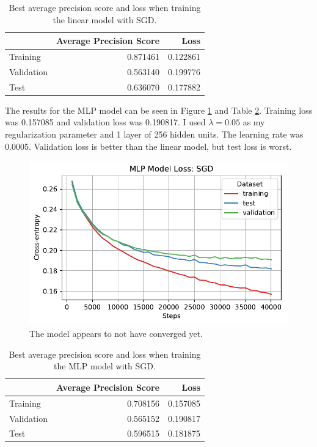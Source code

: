 \documentclass[letterpaper,11pt]{article}
\begin{document}
\begin{enumerate}
  \begin{table}
    \centering
    \begin{tabular}{lrr}
      \toprule
      {} &  Average Precision Score &      Loss \\
      \midrule
      Training   &                 0.871461 &  0.122861 \\
      Validation &                 0.563140 &  0.199776 \\
      Test       &                 0.636070 &  0.177882 \\
      \bottomrule
    \end{tabular}
    \caption{Best average precision score and loss when training the linear
      model with SGD.}
    \label{tab:linear_sgd}
  \end{table}

  The results for the MLP model can be seen in Figure \ref{fig:mlp_loss_sgd} and
  Table \ref{tab:mlp_sgd}. Training loss was 0.157085 and validation loss was
  0.190817. I used $\lambda = 0.05$ as my regularization parameter and 1 layer
  of 256 hidden units. The learning rate was 0.0005. Validation loss is better
  than the linear model, but test loss is worst.

  \begin{figure}
    \centering
    \includegraphics{problem4/mlp_loss_sgd.pdf}
    \caption{The model appears to not have converged yet.}
    \label{fig:mlp_loss_sgd}
  \end{figure}

  \begin{table}
    \centering
    \begin{tabular}{lrr}
      \toprule
      {} &  Average Precision Score &      Loss \\
      \midrule
      Training   &                 0.708156 &  0.157085 \\
      Validation &                 0.565152 &  0.190817 \\
      Test       &                 0.596515 &  0.181875 \\
      \bottomrule
    \end{tabular}
    \caption{Best average precision score and loss when training the MLP
      model with SGD.}
    \label{tab:mlp_sgd}
  \end{table}
  

\end{enumerate}
\end{document}
